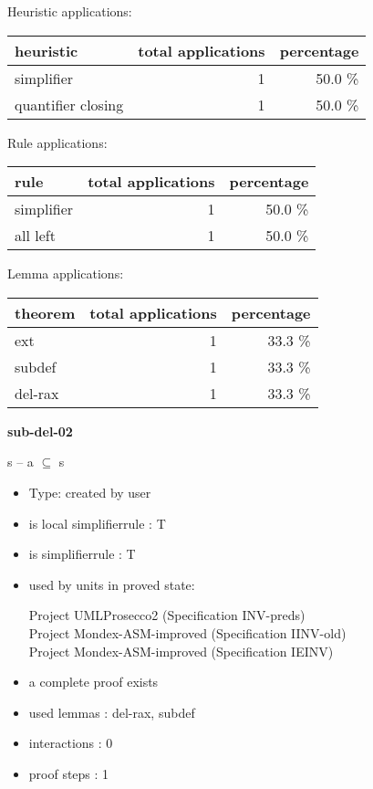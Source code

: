 \documentclass[a4paper]{article}
\begin{document}
\medskip


Heuristic applications:

\begin{supertabular}{l|r|r}
heuristic	& total applications & percentage \\ \hline
simplifier & 1 & 50.0 \% \\
quantifier closing & 1 & 50.0 \% \\

\end{supertabular}

Rule applications:

\begin{supertabular}{l|r|r}
rule	        & total applications & percentage \\ \hline
simplifier & 1 & 50.0 \% \\
all left & 1 & 50.0 \% \\

\end{supertabular}

Lemma applications:

\begin{supertabular}{l|r|r}
theorem	        & total applications & percentage \\ \hline
ext & 1 & 33.3 \% \\
subdef & 1 & 33.3 \% \\
del-rax & 1 & 33.3 \% \\

\end{supertabular}
\pagebreak

{\LARGE\bf sub-del-02}\label{lemma-sub-del-02}

\medskip

 \Fol s -- a $\subseteq$ s

\begin{itemize}

\item Type: created by user

\item is local simplifierrule : T
\item is simplifierrule : T
\item used by units in proved state:

Project UMLProsecco2 (Specification INV-preds) \\
Project Mondex-ASM-improved (Specification IINV-old) \\
Project Mondex-ASM-improved (Specification IEINV)
\item       a complete proof exists
\item       used lemmas  : del-rax, subdef
\item       interactions : 0
\item       proof steps  : 1
\end{itemize}
\end{document}
